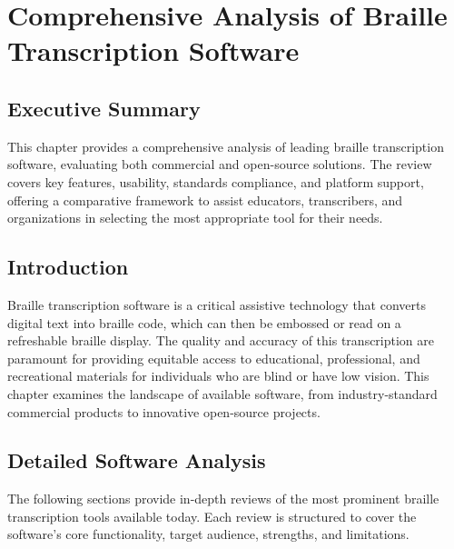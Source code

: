 \chapter{Comprehensive Analysis of Braille Transcription Software}
\label{cha:comprehensive-analysis-of-braille-transcription-software}

\section{Executive Summary}
\label{sec:executive-summary}

This chapter provides a comprehensive analysis of leading braille transcription software, evaluating both commercial and open-source solutions. The review covers key features, usability, standards compliance, and platform support, offering a comparative framework to assist educators, transcribers, and organizations in selecting the most appropriate tool for their needs.

\section{Introduction}
\label{sec:introduction}

Braille transcription software is a critical assistive technology that converts digital text into braille code, which can then be embossed or read on a refreshable braille display. The quality and accuracy of this transcription are paramount for providing equitable access to educational, professional, and recreational materials for individuals who are blind or have low vision. This chapter examines the landscape of available software, from industry-standard commercial products to innovative open-source projects.

\section{Detailed Software Analysis}
\label{sec:detailed-software-analysis}

The following sections provide in-depth reviews of the most prominent braille transcription tools available today. Each review is structured to cover the software's core functionality, target audience, strengths, and limitations.

